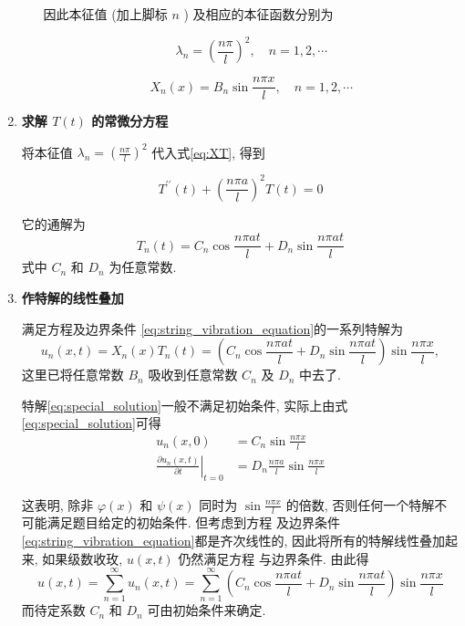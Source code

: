 \begin{solution}
\begin{enumerate}
\begin{itemize}
        因此本征值 (加上脚标 $n$ ) 及相应的本征函数分别为
        
        $$
        \lambda_{n}=\left(\frac{n \pi}{l}\right)^{2}, \quad n=1,2, \cdots
        $$
        
        $$
        X_{n}(x)=B_{n} \sin \frac{n \pi x}{l}, \quad n=1,2, \cdots
        $$
\end{itemize}





  \item \textbf{求解 $T(t)$ 的常微分方程}
  
    将本征值 $\lambda_{n}=\left(\frac{n \pi}{l}\right)^{2}$ 代入式\eqref{eq:XT}, 得到

    $$
    T^{\prime \prime}(t)+\left(\frac{n \pi a}{l}\right)^{2} T(t)=0
    $$

    它的通解为
    $$
    T_{n}(t)=C_{n} \cos \frac{n \pi a t}{l}+D_{n} \sin \frac{n \pi a t}{l}
    $$
    式中 $C_{n}$ 和 $D_{n}$ 为任意常数.
    
    \item \textbf{作特解的线性叠加}
    
    满足方程及边界条件 \eqref{eq:string_vibration_equation}的一系列特解为
    \begin{equation}
        u_{n}(x, t)=X_{n}(x) T_{n}(t)=\left(C_{n} \cos \frac{n \pi a t}{l}+D_{n} \sin \frac{n \pi a t}{l}\right) \sin \frac{n \pi x}{l}, 
        \label{eq:special_solution}
    \end{equation}
    这里已将任意常数 $B_{n}$ 吸收到任意常数 $C_{n}$ 及 $D_{n}$ 中去了.
    
    特解\eqref{eq:special_solution}一般不满足初始条件, 实际上由式\eqref{eq:special_solution}可得 
    $$
    \begin{aligned}
    u_{n}(x, 0) & =C_{n} \sin \frac{n \pi x}{l} \\
    \left.\frac{\partial u_{n}(x, t)}{\partial t}\right|_{t=0} & =D_{n} \frac{n \pi a}{l} \sin \frac{n \pi x}{l}
    \end{aligned}
    $$

    这表明, 除非 $\varphi(x)$ 和 $\psi(x)$ 同时为 $\sin \frac{n \pi x}{l}$ 的倍数,
     否则任何一个特解不可能满足题目给定的初始条件. 
     但考虑到方程  及边界条件\eqref{eq:string_vibration_equation}都是齐次线性的, 
     因此将所有的特解线性叠加起来, 如果级数收玫, $u(x, t)$ 仍然满足方程 与边界条件. 由此得
    \begin{equation}
        u(x, t)=\sum_{n=1}^{\infty} u_{n}(x, t)=
        \sum_{n=1}^{\infty}\left(C_{n} \cos \frac{n \pi a t}{l}+
        D_{n} \sin \frac{n \pi a t}{l}\right) \sin \frac{n \pi x}{l}
        \label{eq:general_solution}
    \end{equation}
    而待定系数 $C_{n}$ 和 $D_{n}$ 可由初始条件来确定.
    


\end{enumerate}
\end{solution}

